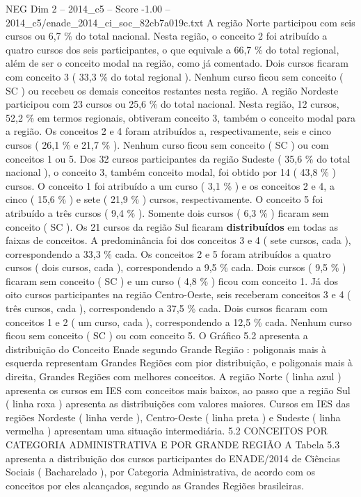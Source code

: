 \begin{textsample}{NEG Dim 2 – 2014\_c5 – Score -1.00 – 2014\_c5/enade\_2014\_ci\_soc\_82cb7a019c.txt}
A região Norte participou com seis cursos ou 6,7 \% do total nacional.
Nesta região, o conceito 2 foi atribuído a quatro cursos dos seis participantes, o que equivale a 66,7 \% do total regional, além de ser o conceito modal na região, como já comentado.
Dois cursos ficaram com conceito 3 ( 33,3 \% do total regional ).
Nenhum curso ficou sem conceito ( SC ) ou recebeu os demais conceitos restantes nesta região.
A região Nordeste participou com 23 cursos ou 25,6 \% do total nacional.
Nesta região, 12 cursos, 52,2 \% em termos regionais, obtiveram conceito 3, também o conceito modal para a região.
Os conceitos 2 e 4 foram atribuídos a, respectivamente, seis e cinco cursos ( 26,1 \% e 21,7 \% ).
Nenhum curso ficou sem conceito ( SC ) ou com conceitos 1 ou 5.
Dos 32 cursos participantes da região Sudeste ( 35,6 \% do total nacional ), o conceito 3, também conceito modal, foi obtido por 14 ( 43,8 \% ) cursos.
O conceito 1 foi atribuído a um curso ( 3,1 \% ) e os conceitos 2 e 4, a cinco ( 15,6 \% ) e sete ( 21,9 \% ) cursos, respectivamente.
O conceito 5 foi atribuído a três cursos ( 9,4 \% ).
Somente dois cursos ( 6,3 \% ) ficaram sem conceito ( SC ).
Os 21 cursos da região Sul ficaram \textbf{distribuídos} em todas as faixas de conceitos.
A predominância foi dos conceitos 3 e 4 ( sete cursos, cada ), correspondendo a 33,3 \% cada.
Os conceitos 2 e 5 foram atribuídos a quatro cursos ( dois cursos, cada ), correspondendo a 9,5 \% cada.
Dois cursos ( 9,5 \% ) ficaram sem conceito ( SC ) e um curso ( 4,8 \% ) ficou com conceito 1.
Já dos oito cursos participantes na região Centro-Oeste, seis receberam conceitos 3 e 4 ( três cursos, cada ), correspondendo a 37,5 \% cada.
Dois cursos ficaram com conceitos 1 e 2 ( um curso, cada ), correspondendo a 12,5 \% cada.
Nenhum curso ficou sem conceito ( SC ) ou com conceito 5.
O Gráfico 5.2 apresenta a distribuição do Conceito Enade segundo Grande Região : poligonais mais à esquerda representam Grandes Regiões com pior distribuição, e poligonais mais à direita, Grandes Regiões com melhores conceitos.
A região Norte ( linha azul ) apresenta os cursos em IES com conceitos mais baixos, ao passo que a região Sul ( linha roxa ) apresenta as distribuições com valores maiores.
Cursos em IES das regiões Nordeste ( linha verde ), Centro-Oeste ( linha preta ) e Sudeste ( linha vermelha ) apresentam uma situação intermediária. 5.2 CONCEITOS POR CATEGORIA ADMINISTRATIVA E POR GRANDE REGIÃO A Tabela 5.3 apresenta a distribuição dos cursos participantes do ENADE/2014 de Ciências Sociais ( Bacharelado ), por Categoria Administrativa, de acordo com os conceitos por eles alcançados, segundo as Grandes Regiões brasileiras.

\end{textsample}
